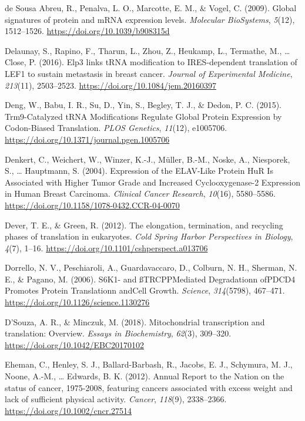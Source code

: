 \documentclass[12pt,openany]{book}
\begin{document}
\hypertarget{ref-deSousaAbreu2009}{}
de Sousa Abreu, R., Penalva, L. O., Marcotte, E. M., \& Vogel, C.
(2009). Global signatures of protein and mRNA expression levels.
\emph{Molecular BioSystems}, \emph{5}(12), 1512--1526.
\url{https://doi.org/10.1039/b908315d}

\hypertarget{ref-Delaunay2016}{}
Delaunay, S., Rapino, F., Tharun, L., Zhou, Z., Heukamp, L., Termathe,
M., \ldots{} Close, P. (2016). Elp3 links tRNA modification to
IRES-dependent translation of LEF1 to sustain metastasis in breast
cancer. \emph{Journal of Experimental Medicine}, \emph{213}(11),
2503--2523. \url{https://doi.org/10.1084/jem.20160397}

\hypertarget{ref-Deng2015}{}
Deng, W., Babu, I. R., Su, D., Yin, S., Begley, T. J., \& Dedon, P. C.
(2015). Trm9-Catalyzed tRNA Modifications Regulate Global Protein
Expression by Codon-Biased Translation. \emph{PLOS Genetics},
\emph{11}(12), e1005706.
\url{https://doi.org/10.1371/journal.pgen.1005706}

\hypertarget{ref-Denkert2004}{}
Denkert, C., Weichert, W., Winzer, K.-J., Müller, B.-M., Noske, A.,
Niesporek, S., \ldots{} Hauptmann, S. (2004). Expression of the
ELAV-Like Protein HuR Is Associated with Higher Tumor Grade and
Increased Cyclooxygenase-2 Expression in Human Breast Carcinoma.
\emph{Clinical Cancer Research}, \emph{10}(16), 5580--5586.
\url{https://doi.org/10.1158/1078-0432.CCR-04-0070}

\hypertarget{ref-Dever2012}{}
Dever, T. E., \& Green, R. (2012). The elongation, termination, and
recycling phases of translation in eukaryotes. \emph{Cold Spring Harbor
Perspectives in Biology}, \emph{4}(7), 1--16.
\url{https://doi.org/10.1101/cshperspect.a013706}

\hypertarget{ref-Dorrello2006}{}
Dorrello, N. V., Peschiaroli, A., Guardavaccaro, D., Colburn, N. H.,
Sherman, N. E., \& Pagano, M. (2006). S6K1- and ßTRCPPMediated
Degradationn ofPDCD4 Promotes Protein Translationn andCell Growth.
\emph{Science}, \emph{314}(5798), 467--471.
\url{https://doi.org/10.1126/science.1130276}

\hypertarget{ref-DSouza2018}{}
D'Souza, A. R., \& Minczuk, M. (2018). Mitochondrial transcription and
translation: Overview. \emph{Essays in Biochemistry}, \emph{62}(3),
309--320. \url{https://doi.org/10.1042/EBC20170102}

\hypertarget{ref-Eheman2012}{}
Eheman, C., Henley, S. J., Ballard-Barbash, R., Jacobs, E. J., Schymura,
M. J., Noone, A.-M., \ldots{} Edwards, B. K. (2012). Annual Report to
the Nation on the status of cancer, 1975-2008, featuring cancers
associated with excess weight and lack of sufficient physical activity.
\emph{Cancer}, \emph{118}(9), 2338--2366.
\url{https://doi.org/10.1002/cncr.27514}
\end{document}
